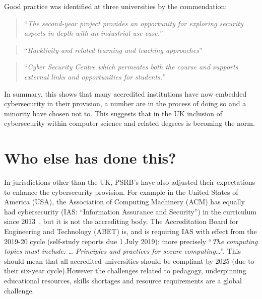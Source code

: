 \documentclass[sigconf]{acmart}
\begin{document}

Good practice was identified at three universities by the commendation:

\begin{quote}
	``{\emph{The second-year project provides an opportunity for exploring security aspects in depth with an industrial use case.}}''
\end{quote}
\begin{quote}
	``{\emph{Hacktivity and related learning and teaching approaches}}''
\end{quote}
\begin{quote}
	``{\emph{Cyber Security Centre which permeates both the course and supports external links and opportunities for students.}}''
\end{quote}

In summary, this shows that many accredited institutions have now embedded cybersecurity in their provision, a number are in the process of doing so and a minority have chosen not to. This suggests that in the UK inclusion of cybersecurity within computer science and related degrees is becoming the norm. 

\section {Who else has done this?}	
In jurisdictions other than the UK, PSRB's have also adjusted their expectations to enhance the cybersecurity provision. For example in the United States of America (USA), the Association of Computing Machinery (ACM) has equally had cybersecurity (IAS: ``Information Assurance and Security'') in the curriculum since 2013~\cite{ACM2013a}, but it is not the accrediting body. The Accreditation Board for Engineering and Technology (ABET) is, and is requiring IAS with effect from the 2019-20 cycle (self-study reports due 1 July 2019): more precisely \cite[Table 3]{Oudshoornetal2018a} ``{\emph{The computing topics must include: \dots{} Principles and practices for secure computing\dots}}''. This should mean that  all accredited universities should be compliant by 2025 (due to their six-year cycle).However the challenges related to pedagogy, underpinning educational resources, skills shortages and resource requirements are a global challenge.
\end{document}
